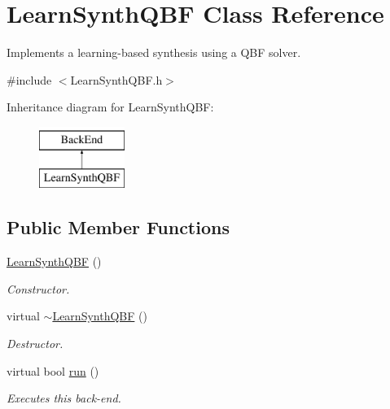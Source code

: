 \hypertarget{classLearnSynthQBF}{\section{Learn\-Synth\-Q\-B\-F Class Reference}
\label{classLearnSynthQBF}
}


Implements a learning-\/based synthesis using a Q\-B\-F solver.  




{\ttfamily \#include $<$Learn\-Synth\-Q\-B\-F.\-h$>$}

Inheritance diagram for Learn\-Synth\-Q\-B\-F\-:\begin{figure}[H]
\begin{center}
\leavevmode
\includegraphics[height=2.000000cm]{classLearnSynthQBF}
\end{center}
\end{figure}
\subsection*{Public Member Functions}
\begin{DoxyCompactItemize}
\item 
\hyperlink{classLearnSynthQBF_ae961d7172f13d52df1b2a7801eb0b0e9}{Learn\-Synth\-Q\-B\-F} ()
\begin{DoxyCompactList}\small\item\em Constructor. \end{DoxyCompactList}\item 
virtual \hyperlink{classLearnSynthQBF_a692e516f27fd78a44884b715688bd7d9}{$\sim$\-Learn\-Synth\-Q\-B\-F} ()
\begin{DoxyCompactList}\small\item\em Destructor. \end{DoxyCompactList}\item 
virtual bool \hyperlink{classLearnSynthQBF_aed85bb2fe317a5fdc7eef71fe598c606}{run} ()
\begin{DoxyCompactList}\small\item\em Executes this back-\/end. \end{DoxyCompactList}\end{DoxyCompactItemize}
